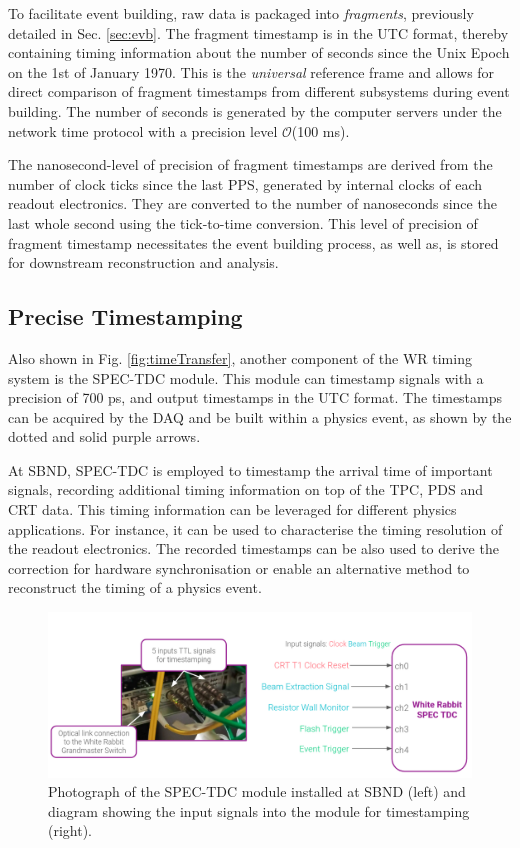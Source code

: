 To facilitate event building, raw data is packaged into \textit{fragments}, previously detailed in Sec. \ref{sec:evb}.
The fragment timestamp is in the UTC format, thereby containing timing information about the number of seconds since the Unix Epoch on the 1st of January 1970.
This is the \textit{universal} reference frame and allows for direct comparison of fragment timestamps from different subsystems during event building.
The number of seconds is generated by the computer servers under the network time protocol with a precision level $\mathcal{O}$(100 ms).

The nanosecond-level of precision of fragment timestamps are derived from the number of clock ticks since the last PPS, generated by internal clocks of each readout electronics.
They are converted to the number of nanoseconds since the last whole second using the tick-to-time conversion.
This level of precision of fragment timestamp necessitates the event building process, as well as, is stored for downstream reconstruction and analysis.

\subsection{Precise Timestamping}
\label{subsec42TimeRef}

Also shown in Fig. \ref{fig:timeTransfer}, another component of the WR timing system is the SPEC-TDC module.
This module can timestamp signals with a precision of 700 ps, and output timestamps in the UTC format.
The timestamps can be acquired by the DAQ and be built within a physics event, as shown by the dotted and solid purple arrows. 

At SBND, SPEC-TDC is employed to timestamp the arrival time of important signals, recording additional timing information on top of the TPC, PDS and CRT data.
This timing information can be leveraged for different physics applications.
For instance, it can be used to characterise the timing resolution of the readout electronics.
The recorded timestamps can be also used to derive the correction for hardware synchronisation or enable an alternative method to reconstruct the timing of a physics event. 

\begin{figure}[b!] 
\centering    
\includegraphics[width=1.0\textwidth]{SPEC_TDC}
\caption[SPEC-TDC Module Photograph and Signal Inputs]{
Photograph of the SPEC-TDC module installed at SBND (left) and diagram showing the input signals into the module for timestamping (right).
}
\label{fig:SPECTDC}
\end{figure}

